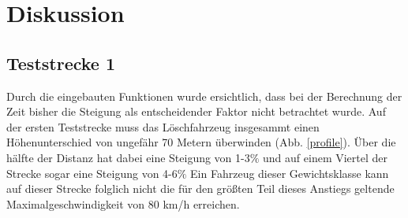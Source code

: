 \section{Diskussion}

\subsection{Teststrecke 1}

Durch die eingebauten Funktionen wurde ersichtlich, dass bei der Berechnung der Zeit bisher die Steigung als entscheidender Faktor nicht betrachtet wurde.
Auf der ersten Teststrecke muss das Löschfahrzeug insgesammt einen Höhenunterschied von ungefähr 70 Metern überwinden (Abb. \ref{profile}).
Über die hälfte der Distanz hat dabei eine Steigung von 1-3$\%$ und auf einem Viertel der Strecke sogar eine Steigung von 4-6$\%$ Ein Fahrzeug dieser Gewichtsklasse kann auf dieser Strecke folglich nicht die für den größten Teil dieses Anstiegs geltende Maximalgeschwindigkeit von 80 km/h erreichen.


